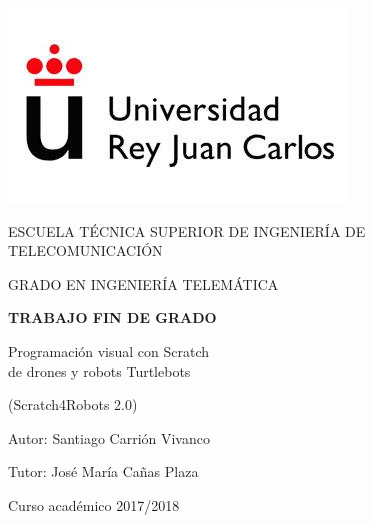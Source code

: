\begin{titlepage}
	\begin{center}
		\vspace*{3mm}
		\begin{center}
			\includegraphics[width=0.4\linewidth]{img/urjc_logo.jpg}
		\end{center}
		\vspace{6.5mm}
		
		\fontsize{15.5}{14}\selectfont ESCUELA TÉCNICA SUPERIOR DE INGENIERÍA DE TELECOMUNICACIÓN
		\vspace{13mm}
		
		\fontsize{14}{14}\selectfont GRADO EN INGENIERÍA TELEMÁTICA
		
		\vspace{70pt}
		
		\fontsize{15.7}{14}\selectfont \textbf{TRABAJO FIN DE GRADO} 
		
		\vspace{15mm}
		\begin{huge}
			Programación visual con Scratch \\ de drones y robots Turtlebots
		\end{huge}
				\begin{huge}
							 (Scratch4Robots 2.0) 

						\end{huge}


		
		\vspace{15mm}
		
		\begin{large}
			Autor: Santiago Carrión Vivanco
			
			Tutor: José María Cañas Plaza
			
			\vspace{10mm}
		\end{large}
		\begin{normalsize}
			Curso académico 2017/2018		
		\end{normalsize}
		\vspace{10mm}
		
	\end{center}
	
\end{titlepage}
